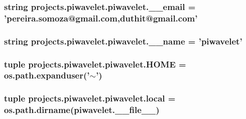 \hypertarget{namespaceprojects_1_1piwavelet_1_1piwavelet_a9048674aaf11471020664488adbb2702}{
\subsubsection[{\-\_\-\-\_\-email}]{\setlength{\rightskip}{0pt plus 5cm}string projects.\-piwavelet.\-piwavelet.\-\_\-\-\_\-email = 'pereira.\-somoza@gmail.\-com,duthit@gmail.\-com'}}\label{namespaceprojects_1_1piwavelet_1_1piwavelet_a9048674aaf11471020664488adbb2702}
\hypertarget{namespaceprojects_1_1piwavelet_1_1piwavelet_ae450eb719290a337821e0182e30a6743}{
\subsubsection[{\-\_\-\-\_\-name}]{\setlength{\rightskip}{0pt plus 5cm}string projects.\-piwavelet.\-piwavelet.\-\_\-\-\_\-name = 'piwavelet'}}\label{namespaceprojects_1_1piwavelet_1_1piwavelet_ae450eb719290a337821e0182e30a6743}
\hypertarget{namespaceprojects_1_1piwavelet_1_1piwavelet_a0edeeca594c8a35263ae0f59cf21ca66}{
\subsubsection[{H\-O\-M\-E}]{\setlength{\rightskip}{0pt plus 5cm}tuple projects.\-piwavelet.\-piwavelet.\-H\-O\-M\-E = os.\-path.\-expanduser('$\sim$')}}\label{namespaceprojects_1_1piwavelet_1_1piwavelet_a0edeeca594c8a35263ae0f59cf21ca66}
\hypertarget{namespaceprojects_1_1piwavelet_1_1piwavelet_ad2547c151ca38fa9f61fcbf62662785a}{
\subsubsection[{local}]{\setlength{\rightskip}{0pt plus 5cm}tuple projects.\-piwavelet.\-piwavelet.\-local = os.\-path.\-dirname(piwavelet.\-\_\-\-\_\-file\-\_\-\-\_\-)}}\label{namespaceprojects_1_1piwavelet_1_1piwavelet_ad2547c151ca38fa9f61fcbf62662785a}
